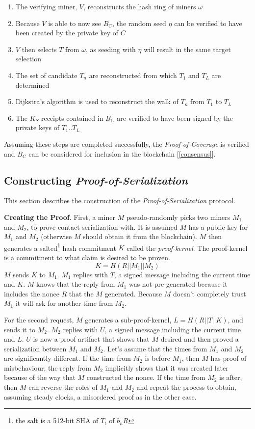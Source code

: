 \documentclass[letterpaper,11pt]{article}
\begin{document}
\begin{enumerate}
        \item The verifying miner, $V$, reconstructs the hash ring of miners $\omega$
        \item Because $V$ is able to now see $B_C$, the random seed $\eta$ can be verified to have been created by the private key of $C$
        \item $V$ then selects $T$ from $\omega$, as seeding with $\eta$ will result in the same target selection
        \item The set of candidate $T_n$ are reconstructed from which $T_1$ and $T_L$ are determined
        \item Dijkstra's algorithm is used to reconstruct the walk of $T_n$ from $T_1$ to $T_L$
        \item The $K_S$ receipts contained in $B_C$ are verified to have been signed by the private keys of $T_1$..$T_L$
\end{enumerate}

Assuming these steps are completed successfully, the \emph{Proof-of-Coverage} is verified and $B_C$ can be considered for inclusion in the blockchain [\ref{consensus}].

\subsection{Constructing \emph{Proof-of-Serialization}}

This section describes the construction of the \emph{Proof-of-Serialization} protocol.

\textbf{Creating the Proof}. First, a miner $M$ pseudo-randomly picks two miners $M_1$ and $M_2$, to prove contact serialization with. It is assumed $M$ has a public key for $M_1$ and $M_2$ (otherwise $M$ should obtain it from the blockchain). $M$ then generates a salted\footnote{the salt is a 512-bit SHA of $T_t$ of $b_n R$} hash commitment $K$ called the \emph{proof-kernel}. The proof-kernel is a commitment to what claim is desired to be proven. \[\mathit{K = H\left(R || M_1 || M_2\right)}\] $M$ sends $K$ to $M_1$. $M_1$ replies with $T$, a signed message including the current time and $K$. $M$ knows that the reply from $M_1$ was not pre-generated because it includes the nonce $R$ that the $M$ generated. Because $M$ doesn't completely trust $M_1$ it will ask for another time from $M_2$.

For the second request, $M$ generates a sub-proof-kernel, $L = H\left(R || T || K\right)$, and sends it to $M_2$. $M_2$ replies with $U$, a signed message including the current time and $L$. $U$ is now a proof artifact that shows that $M$ desired and then proved a serialization between $M_1$ and $M_2$. Let's assume that the times from $M_1$ and $M_2$ are significantly different. If the time from $M_2$ is before $M_1$, then $M$ has proof of misbehaviour; the reply from $M_2$ implicitly shows that it was created later because of the way that $M$ constructed the nonce. If the time from $M_2$ is after, then $M$ can reverse the roles of $M_1$ and $M_2$ and repeat the process to obtain, assuming steady clocks, a misordered proof as in the other case.
\end{document}
